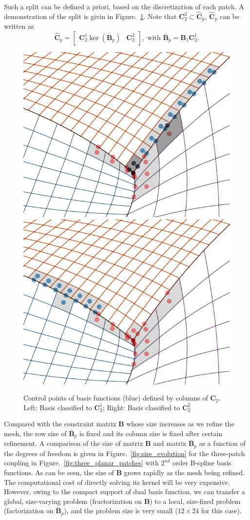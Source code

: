 \documentclass[preprint,12pt]{elsarticle}
\begin{document}
Such a split can be defined a priori, based on the discretization of each patch. A demonstration of the split is givin in Figure.~\ref{fig:overlap_nonoverlap}. Note that $\mathbf{C}_2^2\subset\hat{\mathbf{C}}_p$, $\hat{\mathbf{C}}_p$ can be written as
\begin{equation}
    \hat{\mathbf{C}}_p=
    \begin{bmatrix}
        \mathbf{C}_2^1\ker(\bar{\mathbf{B}}_p) & \mathbf{C}_2^2
    \end{bmatrix}, \text{ with } \bar{\mathbf{B}}_p=\mathbf{B}_1\mathbf{C}_2^1.\label{eq:local_kernel}
\end{equation}
\begin{figure}[hbt]
	\centering
    \includegraphics[width=.47\linewidth]{trim_overlap}
    \includegraphics[width=.47\linewidth]{trim_nonoverlap}
	\caption{Control points of basis functions (blue) defined by columns of $\mathbf{C}_2$. Left: Basis classified to $\mathbf{C}_2^1$; Right: Basis classified to $\mathbf{C}_2^2$}\label{fig:overlap_nonoverlap}
\end{figure}
Compared with the constraint matrix $\mathbf{B}$ whose size increases as we refine the mesh, the row size of $\bar{\mathbf{B}}_p$ is fixed and its column size is fixed after certain refinement. A comparison of the size of matrix $\mathbf{B}$ and matrix $\bar{\mathbf{B}}_p$ as a function of the degrees of freedom is given in Figure.~\ref{fig:size_evolution} for the three-patch coupling in Figure.~\ref{fig:three_planar_patches} with $2^{nd}$ order B-spline basis functions. As can be seen, the size of $\mathbf{B}$ grows rapidly as the mesh being refined. The computational cost of directly solving its kernel will be very expensive. However, owing to the compact support of dual basis function, we can transfer a global, size-varying problem (fractorization on $\mathbf{B}$) to a local, size-fixed problem (factorization on $\bar{\mathbf{B}}_p$), and the problem size is very small ($12\times{24}$ for this case).\par
\end{document}
